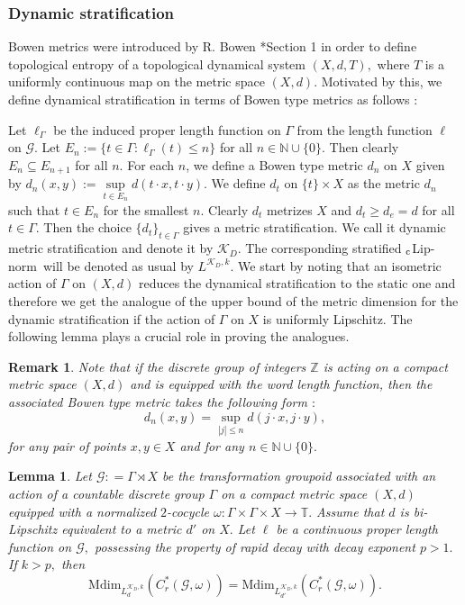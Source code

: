 \documentclass[a4paper,11pt,reqno]{amsart}
\theoremstyle{plain}
\newtheorem{lem}[thm]{Lemma}
\newtheorem{rem}[thm]{Remark}
\theoremstyle{mainthmstyle}
\theoremstyle{named}
\numberwithin{equation}{section}
\newcommand{\clipnorm}{$_{\text{\rm c}}$Lip-norm}
\begin{document}
\subsubsection{Dynamic stratification} Bowen metrics were introduced by R. Bowen \cite{bowen1971entropy}*{Section 1} in order to define topological entropy of a topological dynamical system $(X, d, T),$ where $T$ is a uniformly continuous map on the metric space $(X, d).$ Motivated by this, we define dynamical stratification in terms of Bowen type metrics as follows $:$

\vspace{2mm}

Let $\ell_{\Gamma}$ be the induced proper length function on $\Gamma$ from the length function $\ell$ on $\mathcal{G}$. Let $E_{n}:=\{t\in\Gamma: \ell_{\Gamma}(t)\leq n\}$ for all $n\in\mathbb{N}\cup\{0\}$. Then clearly $E_{n}\subseteq E_{n+1}$ for all $n$. For each $n$, we define a Bowen type metric $d_{n}$ on $X$ given by $d_{n}(x,y):=\sup\limits_{t\in E_{n}}d(t\cdot x,t\cdot y)$. We define $d_{t}$ on $\{t\}\times X$ as the metric $d_{n}$ such that $t\in E_{n}$ for the smallest $n$. Clearly $d_{t}$ metrizes $X$ and $d_{t}\geq d_{e}=d$ for all $t\in\Gamma$. Then the choice $\{d_{t}\}_{t\in\Gamma}$ gives a metric stratification. We call it dynamic metric stratification and denote it by $\mathcal{K}_{D}$. The corresponding stratified \clipnorm\ will be denoted as usual by $L^{\mathcal{K}_{D},k}$. We start by noting that an isometric action of $\Gamma$ on $(X,d)$ reduces the dynamical stratification to the static one and therefore we get the analogue of the upper bound of the metric dimension for the dynamic stratification if the action of $\Gamma$ on $X$ is uniformly Lipschitz. The following lemma plays a crucial role in proving the analogues.

\begin{rem}
Note that if the discrete group of integers $\mathbb Z$ is acting on a compact metric space $(X, d)$ and is equipped with the word length function, then the associated Bowen type metric takes the following form $:$
$$d_n (x, y) = \sup\limits_{\left \lvert j \right \rvert \leq n} d (j \cdot x, j \cdot y),$$ for any pair of points $x, y \in X$ and for any $n \in \mathbb N \cup \{0\}.$
\end{rem}

\begin{lem}\label{uniformly Lipschitz}
Let $\mathcal{G} : = \Gamma \rtimes X$ be the transformation groupoid associated with an action of a countable discrete group $\Gamma$ on a compact metric space $(X, d)$ equipped with a normalized $2$-cocycle $\omega : \Gamma \times \Gamma \times X \rightarrow \mathbb T.$ Assume that $d$ is bi-Lipschitz equivalent to a metric $d'$ on $X.$ Let $\ell$ be a continuous proper length function on $\mathcal G,$ possessing the property of rapid decay with decay exponent $p > 1.$ If $k > p,$ then
$$\mathrm{Mdim}_{L_d^{\mathcal K_D,k}} (C_r^*(\mathcal{G}, \omega)) = \mathrm{Mdim}_{L_{d'}^{\mathcal K_D, k}} \left (C_r^{\ast} (\mathcal G, \omega) \right ).$$
\end{lem}
\end{document}
